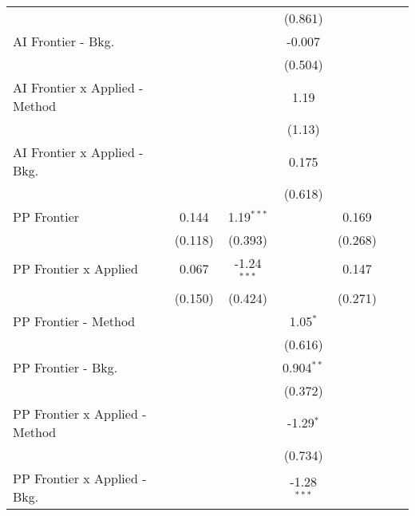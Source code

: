 \begin{tabular}{lcccccc}
                                  &          &               & (0.861)       &         &        &   \\   
   AI Frontier - Bkg.             &          &               & -0.007        &         &        &   \\   
                                  &          &               & (0.504)       &         &        &   \\   
   AI Frontier x Applied - Method &          &               & 1.19          &         &        &   \\   
                                  &          &               & (1.13)        &         &        &   \\   
   AI Frontier x Applied - Bkg.   &          &               & 0.175         &         &        &   \\   
                                  &          &               & (0.618)       &         &        &   \\   
   PP Frontier                    & 0.144    & 1.19$^{***}$  &               & 0.169   &        &   \\   
                                  & (0.118)  & (0.393)       &               & (0.268) &        &   \\   
   PP Frontier x Applied          & 0.067    & -1.24$^{***}$ &               & 0.147   &        &   \\   
                                  & (0.150)  & (0.424)       &               & (0.271) &        &   \\   
   PP Frontier - Method           &          &               & 1.05$^{*}$    &         &        &   \\   
                                  &          &               & (0.616)       &         &        &   \\   
   PP Frontier - Bkg.             &          &               & 0.904$^{**}$  &         &        &   \\   
                                  &          &               & (0.372)       &         &        &   \\   
   PP Frontier x Applied - Method &          &               & -1.29$^{*}$   &         &        &   \\   
                                  &          &               & (0.734)       &         &        &   \\   
   PP Frontier x Applied - Bkg.   &          &               & -1.28$^{***}$ &         &        &   \\   

\end{tabular}
